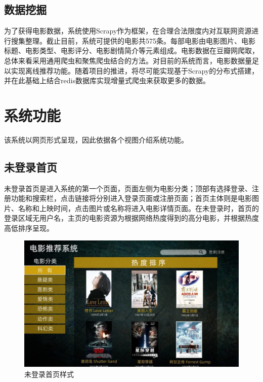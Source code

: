 \documentclass{ctexart}
\begin{document}
\subsection{数据挖掘}
为了获得电影数据，系统使用Scrapy作为框架，在合理合法限度内对互联网资源进行搜集整理。截止目前，系统可提供的电影共575条。每部电影由电影图片、电影标题、电影类型、电影评分、电影剧情简介等元素组成。电影数据在豆瓣网爬取，总体来看采用通用爬虫和聚焦爬虫结合的方法。对目前的系统而言，电影数据量足以实现离线推荐功能。随着项目的推进，将尽可能实现基于Scrapy的分布式搭建，并在此基础上结合redis数据库实现增量式爬虫来获取更多的数据。

\section{系统功能}
该系统以网页形式呈现，因此依据各个视图介绍系统功能。

\subsection{未登录首页}
未登录首页是进入系统的第一个页面，页面左侧为电影分类；顶部有选择登录、注册功能和搜索栏，点击链接将分别进入登录页面或注册页面；首页主体则是电影图片、名称和上映时间，点击图片或名称将进入电影详情页面。在未登录时，首页的登录区域无用户名，主页的电影资源为根据网络热度得到的高分电影，并根据热度高低排序呈现。
\begin {figure}[h]
\centering %
\includegraphics[width=\textwidth]{p1.jpg}
\caption{未登录首页样式} %
\label{five}
\end {figure}
\end{document}
